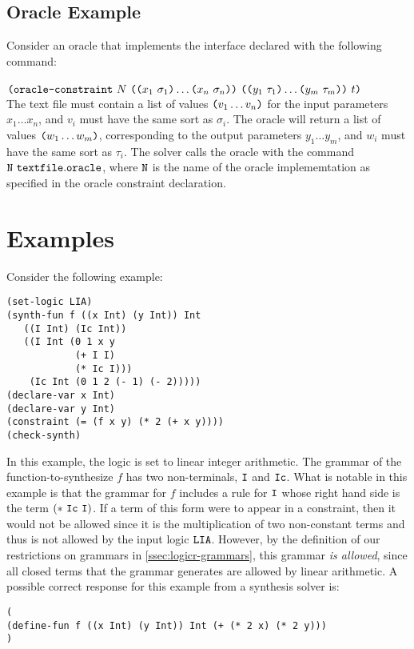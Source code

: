 \documentclass[english,a4paper,10pt]{article}
\begin{document}
\subsection{Oracle Example}

\noindent Consider an oracle that implements the interface declared with the following command:\\\\
$\texttt{(}\texttt{oracle-constraint}\mbox{ } N \mbox{ }
\texttt{(}\texttt{(}x_1\mbox{ }\sigma_1\texttt{)} \ldots \texttt{(}x_n\mbox{ }\sigma_n\texttt{)}\texttt{)}\mbox{ }
\texttt{(}\texttt{(}y_{1}\mbox{ }\tau_{1}\texttt{)} \ldots \texttt{(}y_{m}\mbox{ }\tau_{m}\texttt{)}\texttt{)}  \mbox{ } t\texttt{)}$ \\

The text file must contain a list of values $\texttt{(}v_1 \ldots v_n\texttt{)}$ for the input parameters $x_1 \ldots x_n$, and $v_i$ must have the same sort as $\sigma_i$.
The oracle will return a list of values $\texttt{(}w_{1} \ldots w_{m}\texttt{)}$, corresponding to the output parameters $y_{1} \ldots y_{m}$, and $w_i$ must have the same sort as $\tau_i$.
%
The solver calls the oracle with the command ${\tt N \,\,textfile.oracle}$, where ${\tt N}$ is the name of the oracle implememtation as specified in the oracle constraint declaration.


\section{Examples}%
\label{sec:examples}


\begin{example}
Consider the following example:
\begin{lstlisting}[language=SyGuS]
(set-logic LIA)
(synth-fun f ((x Int) (y Int)) Int
   ((I Int) (Ic Int))
   ((I Int (0 1 x y
            (+ I I)
            (* Ic I)))
    (Ic Int (0 1 2 (- 1) (- 2)))))
(declare-var x Int)
(declare-var y Int)
(constraint (= (f x y) (* 2 (+ x y))))
(check-synth)
\end{lstlisting}
In this example, the logic is set 
to linear integer arithmetic.
The grammar of the function-to-synthesize $f$
has two non-terminals, ${\tt I}$ and ${\tt Ic}$.
What is notable in this example is that
the grammar for $f$ includes a rule for ${\tt I}$ whose right hand side 
is the term ${\tt(*\ Ic\ I)}$. 
If a term of this form were to appear
in a constraint, 
then it would not be allowed since it is the
multiplication of two non-constant terms and thus is not allowed by the input logic ${\tt LIA}$.
However, 
by the definition of our restrictions on grammars in \cref{ssec:logicr-grammars},
this grammar \emph{is allowed},
since all closed terms that the grammar generates are allowed by linear arithmetic.
A possible correct response for this example from a synthesis solver is:
\begin{lstlisting}[language=SyGuS]
(
(define-fun f ((x Int) (y Int)) Int (+ (* 2 x) (* 2 y)))
)
\end{lstlisting}
\end{example}
\end{document}
